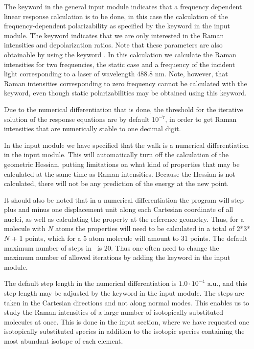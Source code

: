 The keyword  in the general input module indicates that
a frequency dependent linear response
calculation is to be done, in
this case the calculation of the frequency-dependent
polarizability as
specified by the  keyword in the  input
module. The keyword  indicates that we are only
interested in the Raman intensities and
depolarization ratios. Note
that these parameters are also obtainable by using the keyword
. In this calculation we calculate the Raman intensities for two
frequencies, the static case and a frequency of the incident light
corresponding to a laser of wavelength 488.8 nm. Note, however, that
Raman intensities corresponding to zero frequency cannot be calculated
with the  keyword, even though static
polarizabilities may be obtained using this keyword.

Due to the numerical differentiation
that is done, the threshold for
the iterative solution of the response equations are by default
10$^{-7}$, in order to get Raman intensities that are numerically
stable to one decimal digit.

In the  input module we have specified
that the walk is a numerical differentiation in the 
input module. This will automatically
turn off the calculation of the geometric Hessian,
putting limitations
on what kind of properties that may be calculated at the same time as
Raman intensities. Because the Hessian is not calculated,
there will not be any prediction of the energy at the new
point.

It should also be noted that  in a numerical
differentiation the
program will
step plus and minus one displacement unit along each Cartesian coordinate
of all nuclei, as well as calculating the property at the reference
geometry. Thus, for a molecule with $N$ atoms the properties will need
to be calculated in a total of 2*3*$N$ + 1 points, which for a 5 atom
molecule will amount to 31 points. The default maximum number of
steps in \siraba\ is 20. Thus one often need to
change the maximum number of allowed iterations by adding the keyword
 in the  input module.

The default step length in the numerical
differentiation is $1.0\cdot 10^{-4}$
a.u., and this step length may be adjusted by the keyword
 in the  input module. The steps are taken
in the Cartesian directions and
not along normal modes. This enables us to study the Raman intensities
of a large number of isotopically substituted molecules at once. This
is done in the  input section, where we
have requested one isotopically substituted species in addition to the
isotopic species containing the most abundant isotope of each element.

